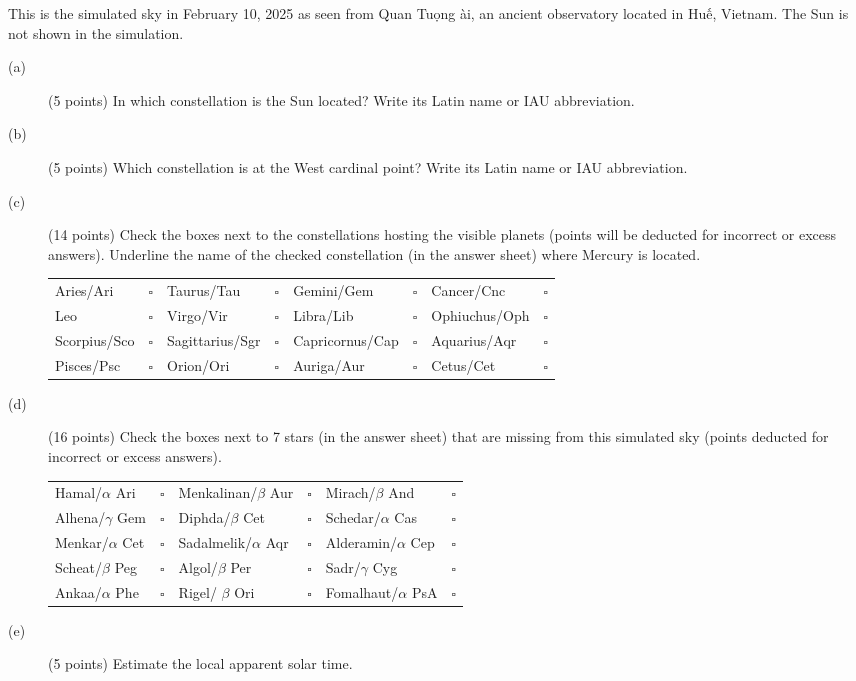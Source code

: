 This is the simulated sky in February 10, 2025 as seen from Quan Tu\d{o}ng
\DJ\`ai, an ancient observatory located in Hu\'{\^e}, Vietnam. The Sun is not
shown in the simulation.

\begin{description}
\item[(a)] (5 points) In which constellation is the Sun located? Write its
  Latin name or IAU abbreviation.
\item[(b)] (5 points) Which constellation is at the West cardinal point? Write
  its Latin name or IAU abbreviation.
\item[(c)] (14 points) Check the boxes next to the constellations hosting the
  visible planets (points will be deducted for incorrect or excess answers).
  Underline the name of the checked constellation (in the answer sheet) where
  Mercury is located.

  \begin{center}
  \begin{tabular}{l@{\ }c@{\qquad}l@{\ }c@{\qquad}l@{\ }c@{\qquad}l@{\ }c}
  Aries/Ari & $\square$ & Taurus/Tau & $\square$ & Gemini/Gem & $\square$ & Cancer/Cnc & $\square$ \\
  Leo & $\square$ & Virgo/Vir & $\square$ & Libra/Lib & $\square$ & Ophiuchus/Oph & $\square$ \\
  Scorpius/Sco & $\square$ & Sagittarius/Sgr & $\square$ & Capricornus/Cap & $\square$ & Aquarius/Aqr & $\square$ \\
  Pisces/Psc & $\square$ & Orion/Ori & $\square$ & Auriga/Aur & $\square$ & Cetus/Cet & $\square$ \\
  \end{tabular}
  \end{center}

\item[(d)] (16 points) Check the boxes next to 7 stars (in the answer sheet)
  that are missing from this simulated sky (points deducted for incorrect or
  excess answers).

  \begin{center}
  \begin{tabular}{l@{\ }c@{\qquad}l@{\ }c@{\qquad}l@{\ }c}
  Hamal/$\alpha$ Ari & $\square$ & Menkalinan/$\beta$ Aur & $\square$ & Mirach/$\beta$ And & $\square$ \\
  Alhena/$\gamma$ Gem & $\square$ & Diphda/$\beta$ Cet & $\square$ & Schedar/$\alpha$ Cas & $\square$ \\
  Menkar/$\alpha$ Cet & $\square$ & Sadalmelik/$\alpha$ Aqr & $\square$ & Alderamin/$\alpha$ Cep & $\square$ \\
  Scheat/$\beta$ Peg & $\square$ & Algol/$\beta$ Per & $\square$ & Sadr/$\gamma$ Cyg & $\square$ \\
  Ankaa/$\alpha$ Phe & $\square$ & Rigel/ $\beta$ Ori & $\square$ & Fomalhaut/$\alpha$ PsA & $\square$ \\
  \end{tabular}
  \end{center}

\item[(e)] (5 points) Estimate the local apparent solar time.
\end{description}
